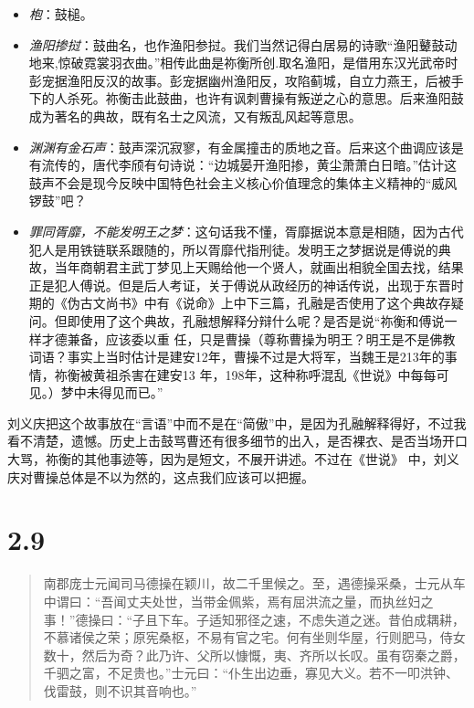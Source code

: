 \documentclass[]{book}
\begin{document}
\begin{itemize}
\item
  \emph{枹}：鼓槌。
\item
  \emph{渔阳掺挝}：鼓曲名，也作渔阳参挝。我们当然记得白居易的诗歌``渔阳鼙鼓动地来,惊破霓裳羽衣曲。''相传此曲是祢衡所创.取名渔阳，是借用东汉光武帝时彭宠据渔阳反汉的故事。彭宠据幽州渔阳反，攻陷蓟城，自立力燕王，后被手下的人杀死。祢衡击此鼓曲，也许有讽刺曹操有叛逆之心的意思。后来渔阳鼓成为著名的典故，既有名士之风流，又有叛乱风起等意思。
\item
  \emph{渊渊有金石声}：鼓声深沉寂寥，有金属撞击的质地之音。后来这个曲调应该是有流传的，唐代李颀有句诗说：``边城晏开渔阳掺，黄尘萧萧白日暗。''估计这鼓声不会是现今反映中国特色社会主义核心价值理念的集体主义精神的``威风锣鼓''吧？
\item
  \emph{罪同胥靡，不能发明王之梦}：这句话我不懂，胥靡据说本意是相随，因为古代犯人是用铁链联系跟随的，所以胥靡代指刑徒。发明王之梦据说是傅说的典故，当年商朝君主武丁梦见上天赐给他一个贤人，就画出相貌全国去找，结果正是犯人傅说。但是后人考证，关于傅说从政经历的神话传说，出现于东晋时期的《伪古文尚书》中有《说命》上中下三篇，孔融是否使用了这个典故存疑问。但即使用了这个典故，孔融想解释分辩什么呢？是否是说``祢衡和傅说一样才德兼备，应该委以重
  任，只是曹操（尊称曹操为明王？明王是不是佛教词语？事实上当时估计是建安12年，曹操不过是大将军，当魏王是213年的事情，祢衡被黄祖杀害在建安13
  年，198年，这种称呼混乱《世说》中每每可见。）梦中未得见而已。''
\end{itemize}

刘义庆把这个故事放在``言语''中而不是在``简傲''中，是因为孔融解释得好，不过我看不清楚，遗憾。历史上击鼓骂曹还有很多细节的出入，是否裸衣、是否当场开口大骂，祢衡的其他事迹等，因为是短文，不展开讲述。不过在《世说》
中，刘义庆对曹操总体是不以为然的，这点我们应该可以把握。

\section{2.9}\label{section-55}

\begin{quote}
南郡庞士元闻司马德操在颖川，故二千里候之。至，遇德操采桑，士元从车中谓曰：``吾闻丈夫处世，当带金佩紫，焉有屈洪流之量，而执丝妇之事！''德操曰：``子且下车。子适知邪径之速，不虑失道之迷。昔伯成耦耕，不慕诸侯之荣；原宪桑枢，不易有官之宅。何有坐则华屋，行则肥马，侍女数十，然后为奇？此乃许、父所以慷慨，夷、齐所以长叹。虽有窃秦之爵，千驷之富，不足贵也。''士元曰：``仆生出边垂，寡见大义。若不一叩洪钟、伐雷鼓，则不识其音响也。''
\end{quote}
\end{document}
